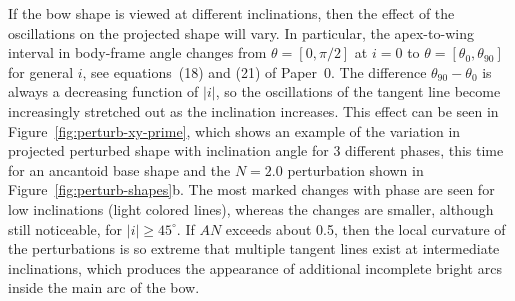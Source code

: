 \documentclass[useAMS, usenatbib, a4paper]{mnras}
\begin{document}
If the bow shape is viewed at different inclinations, then the effect
of the oscillations on the projected shape will vary.  In particular,
the apex-to-wing interval in body-frame angle changes from
\(\theta = [0, \pi/2]\) at \(i = 0\) to
\(\theta = [\theta_0, \theta_{90}]\) for general \(i\), see equations~(18) and (21)
of Paper~0.  The difference \(\theta_{90} - \theta_0\) is always a decreasing
function of \(|i|\), so the oscillations of the tangent line become
increasingly stretched out as the inclination increases.  This effect
can be seen in Figure~\ref{fig:perturb-xy-prime}, which shows an
example of the variation in projected perturbed shape with inclination
angle for 3 different phases, this time for an ancantoid base shape
and the \(N = 2.0\) perturbation shown in
Figure~\ref{fig:perturb-shapes}b.  The most marked changes with phase
are seen for low inclinations (light colored lines), whereas the
changes are smaller, although still noticeable, for
\(|i| \ge 45^\circ\). If \(A N\) exceeds about 0.5, then the local curvature
of the perturbations is so extreme that multiple tangent lines exist
at intermediate inclinations, which produces the appearance of
additional incomplete bright arcs inside the main arc of the bow.


 

\bsp	
\label{lastpage}
\end{document}
